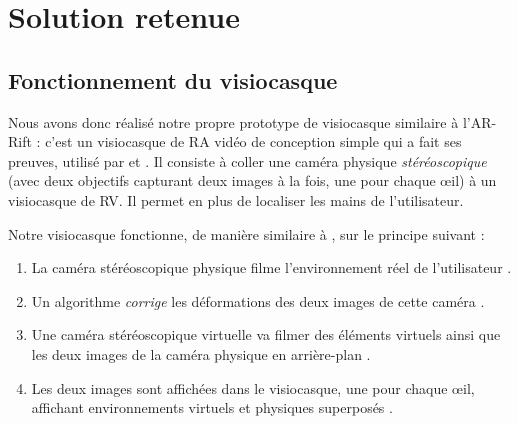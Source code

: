 \section{Solution retenue}
\label{sec:prototype}

\subsection{Fonctionnement du visiocasque}
\label{subsec:prototype_operation}
Nous avons donc réalisé notre propre prototype de visiocasque similaire à l'AR-Rift \citep{Steptoe2013} : c'est un visiocasque de RA vidéo de conception simple qui a fait ses preuves, utilisé par \cite{Steptoe2014} et \cite{Piumsomboon2014}. Il consiste à coller une caméra physique \emph{stéréoscopique} (avec deux objectifs capturant deux images à la fois, une pour chaque \oe il) à un visiocasque de RV. Il permet en plus de localiser les mains de l'utilisateur.

Notre visiocasque fonctionne, de manière similaire à \cite{Steptoe2013}, sur le principe suivant :
\begin{enumerate}
  \item La caméra stéréoscopique physique filme l'environnement réel de l'utilisateur .
  \item Un algorithme \emph{corrige} les déformations des deux images de cette caméra .
  \item Une caméra stéréoscopique virtuelle va filmer des éléments virtuels ainsi que les deux images de la caméra physique en arrière-plan .
  \item Les deux images sont affichées dans le visiocasque, une pour chaque \oe il, affichant environnements virtuels et physiques superposés .
\end{enumerate}
\bigskip



